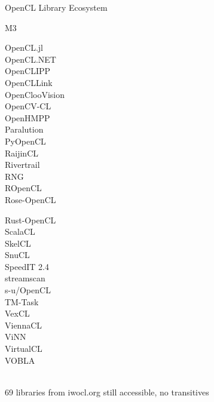 \begin{frame}{OpenCL Library Ecosystem}
\begin{minipage}{0.2\textwidth}
M3\\
 \end{minipage}
  \begin{minipage}{0.20\textwidth}
OpenCL.jl\\
OpenCL.NET\\
OpenCLIPP\\
OpenCLLink\\
OpenClooVision\\
OpenCV-CL\\
OpenHMPP\\
Paralution\\
PyOpenCL\\
RaijinCL\\
Rivertrail\\
RNG\\
ROpenCL\\
Rose-OpenCL\\
 \end{minipage}
  \begin{minipage}{0.19\textwidth}
Rust-OpenCL\\
ScalaCL\\
SkelCL\\
SnuCL\\
SpeedIT 2.4\\
streamscan\\
s-u/OpenCL\\
TM-Task\\
VexCL\\
ViennaCL\\
ViNN\\
VirtualCL\\
VOBLA\\
 \\
 \end{minipage}
 
 \begin{center}
  69 libraries from iwocl.org still accessible, no transitives
 \end{center}
 
\end{frame}


